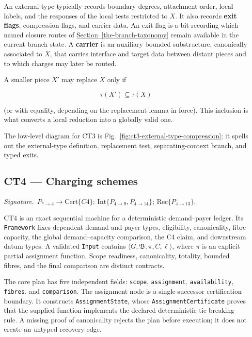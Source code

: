 \documentclass[
  11pt,
]{article}
\theoremstyle{definition}
\newcommand{\secref}[1]{\hyperref[#1]{Section~\ref*{#1}}}
\newcommand{\ctsignature}[1]{\par\noindent\emph{Signature.}\ #1\par\medskip}
\newcommand{\ctcert}[1]{\mathrm{Cert}\{#1\}}
\newcommand{\ctint}[1]{\mathrm{Int}\{#1\}}
\newcommand{\ctrec}[1]{\mathrm{Rec}\{#1\}}
\begin{document}
An external type typically records boundary degrees, attachment order,
local labels, and the responses of the local tests restricted to \(X\).
It also records \textbf{exit flags}, compression flags, and carrier
data. An exit flag is a bit recording which named closure routes of
\secref{the-branch-taxonomy} remain available in the current branch state. A
\textbf{carrier} is an auxiliary bounded substructure, canonically
associated to \(X\), that carries interface and target data between
distant pieces and to which charges may later be routed.

A smaller piece \(X'\) may replace \(X\) only if

\[
\tau(X') \subseteq \tau(X)
\]

(or with equality, depending on the replacement lemma in force). This
inclusion is what converts a local reduction into a globally valid one.

The low-level diagram for CT3 is Fig.~\ref{fig:ct3-external-type-compression};
it spells out the external-type definition, replacement test,
separating-context branch, and typed exits.



\subsection{CT4 --- Charging schemes}\label{ct:4}\label{charging-schemes}
\ctsignature{\(P_{\ast\to4}\to \ctcert{C4};\ \ctint{P_{4\to9},P_{4\to14}};\ \ctrec{P_{4\to13}}\).}

CT4 is an exact sequential machine for a deterministic demand--payer ledger.
Its \texttt{Framework} fixes dependent demand and payer types, eligibility,
canonicality, fibre capacity, the global demand--capacity comparison, the C4
claim, and downstream datum types.  A validated \texttt{Input} contains
\(\langle G,\mathfrak B,\pi,C,\ell\rangle\), where \(\pi\) is an explicit
partial assignment function.  Scope readiness, canonicality, totality, bounded
fibres, and the final comparison are distinct contracts.

The core plan has five independent fields:
\texttt{scope}, \texttt{assignment}, \texttt{availability},
\texttt{fibres}, and \texttt{comparison}.  The assignment node is a
single-successor certification boundary.  It constructs
\texttt{AssignmentState}, whose \texttt{AssignmentCertificate} proves that
the supplied function implements the declared deterministic tie-breaking
rule.  A missing proof of canonicality rejects the plan before execution; it
does not create an untyped recovery edge.
\end{document}
